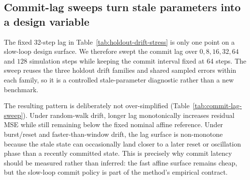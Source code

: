 \documentclass[11pt]{article}
\begin{document}
\subsection{Commit-lag sweeps turn stale parameters into a design variable}

The fixed 32-step lag in Table~\ref{tab:holdout-drift-stress} is only one
point on a slow-loop design surface.  We therefore swept the commit lag over
\(0,8,16,32,64\) and \(128\) simulation steps while keeping the commit interval
fixed at 64 steps.  The sweep reuses the three holdout drift families and
shared sampled errors within each family, so it is a controlled stale-parameter
diagnostic rather than a new benchmark.

The resulting pattern is deliberately not over-simplified
(Table~\ref{tab:commit-lag-sweep}).  Under random-walk drift, longer lag
monotonically increases residual MSE while still remaining below the fixed
nominal affine reference.  Under burst/reset and faster-than-window drift, the
lag surface is non-monotone because the stale state can occasionally land
closer to a later reset or oscillation phase than a recently committed state.
This is precisely why commit latency should be measured rather than inferred:
the fast affine surface remains cheap, but the slow-loop commit policy is part
of the method's empirical contract.

\begin{table}[t]
\centering
\small
{}
\caption{Commit-lag sweep for the lagged affine reference.  Entries are
residual MSE across 384 sequences of 512 steps; lower is better.  The commit
interval is fixed at 64 simulation steps and the columns sweep additional
simulation-step lag.  This table is a non-hardware stale-parameter diagnostic,
not a measured FPGA-latency result, source-vs-board agreement,
trained-branch holdout generalization, a confidence-interval analysis or
logical-channel fidelity.}
\label{tab:commit-lag-sweep}
\end{table}
\end{document}
